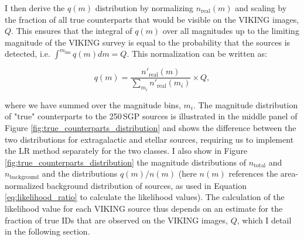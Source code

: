 I then derive the $q(m)$ distribution by normalizing $n_{\textrm{real}}(m)$ and scaling by the fraction of all true counterparts that would be visible on the VIKING images, $Q$. This ensures that the integral of $q(m)$ over all magnitudes up to the limiting magnitude of the VIKING survey is equal to the probability that the sources is detected, i.e. $\int^{m_{\textrm{lim}}} q(m)dm = Q$. This normalization can be written as:

\begin{equation}
\label{eq:true_counterparts_distribution}
    q(m) = \frac{n'_{\textrm{real}}(m)}{\sum_{m_i}n'_{\textrm{real}}(m_i)}\times Q,
\end{equation}

where we have summed over the magnitude bins, $m_i$. The magnitude distribution of "true" counterparts to the 250\,\micron SGP sources is illustrated in the middle panel of Figure \ref{fig:true_counterparts_distribution} and shows the difference between the two distributions for extragalactic and stellar sources, requiring us to implement the LR method separately for the two classes. I also show in Figure \ref{fig:true_counterparts_distribution} the magnitude distributions of $n_{\textrm{total}}$ and $n_{\textrm{background}}$ and the distributions $q(m)/n(m)$ (here $n(m)$ references the area-normalized background distribution of sources, as used in Equation \ref{eq:likelihood_ratio} to calculate the likelihood values). The calculation of the likelihood value for each VIKING source thus depends on an estimate for the fraction of true IDs that are observed on the VIKING images, $Q$, which I detail in the following section.

